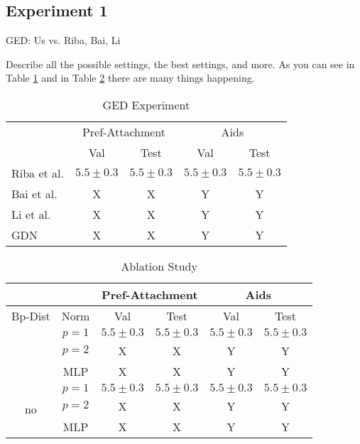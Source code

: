 \subsection{Experiment 1}

GED: Us vs. Riba, Bai, Li

Describe all the possible settings, the best settings, and more. As you can see in Table \ref{tab:ex1-baselines} and in Table \ref{tab:ex1-ablation} there are many things happening.


\begin{table}[htbp]
    \addtolength{\tabcolsep}{-1pt}
    \fontsize{9pt}{10.25pt}\selectfont
    \centering
    \renewcommand{\arraystretch}{1.2}
    \begin{tabular}{|l|c|c|c|c|}
        \hline
        \multirow{2}{*}{} & \multicolumn{2}{c|}{Pref-Attachment} & \multicolumn{2}{c|}{Aids} \\ \hhline{|~|-|-|-|-|}
        & Val & Test & Val & Test \\ \hhline{|=|=|=|=|=|}
        Riba et al. & $5.5 \pm 0.3$ & $5.5 \pm 0.3$ & $5.5 \pm 0.3$ & $5.5 \pm 0.3$ \\ \hline
        Bai et al. & X & X & Y & Y \\ \hline
        Li et al. & X & X & Y & Y \\ \hline
        GDN & X & X & Y & Y \\ \hline
    \end{tabular}
    \caption{GED Experiment}
    \label{tab:ex1-baselines}
\end{table}


\begin{table}[htbp]
    \addtolength{\tabcolsep}{-1pt}
    \fontsize{9pt}{10.25pt}\selectfont
    \centering
    \renewcommand{\arraystretch}{1.2}
    \begin{tabular}{|c|c|c|c|c|c|}
        \hline
        \multicolumn{2}{|c|}{} & \multicolumn{2}{c|}{Pref-Attachment} & \multicolumn{2}{c|}{Aids} \\ \hline
        Bp-Dist & Norm & Val & Test & Val & Test \\ \hhline{|=|=|=|=|=|=|}
        \multirow{3}{*}{yes} & $p=1$ & $5.5 \pm 0.3$ & $5.5 \pm 0.3$ & $5.5 \pm 0.3$ & $5.5 \pm 0.3$ \\ \hhline{|~|-|-|-|-|-|}
        & $p=2$ & X & X & Y & Y \\ \hhline{|~|-|-|-|-|-|}
        & MLP & X & X & Y & Y \\ \hline
        \multirow{3}{*}{no}  & $p=1$ & $5.5 \pm 0.3$ & $5.5 \pm 0.3$ & $5.5 \pm 0.3$ & $5.5 \pm 0.3$ \\ \hhline{|~|-|-|-|-|-|}
        & $p=2$ & X & X & Y & Y \\ \hhline{|~|-|-|-|-|-|}
        & MLP & X & X & Y & Y \\ \hline
    \end{tabular}
    \caption{Ablation Study}
    \label{tab:ex1-ablation}
\end{table}



